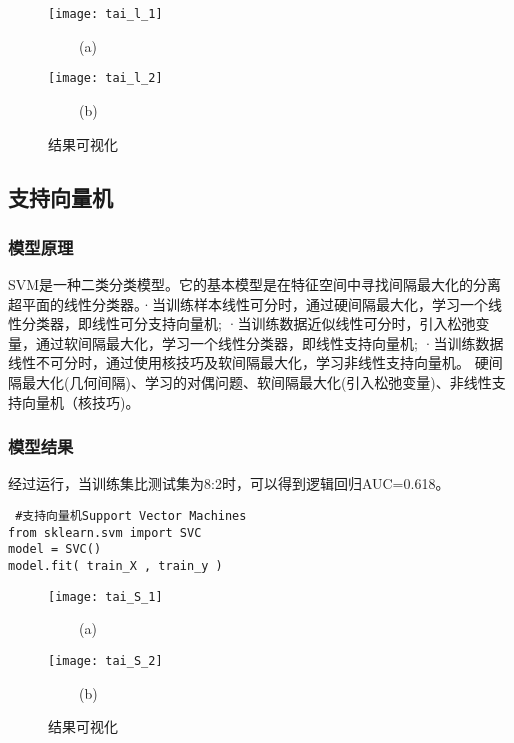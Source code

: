 \documentclass[withoutpreface,bwprint]{cumcmthesis} %
\begin{document}
\begin{figure}[H]
	\centering
	\begin{minipage}[t]{0.48\textwidth}
		\centering
		\texttt{[image: tai\_l\_1]}
		\centerline{$\ \ \ \ \ \ \ \ \ \ $(a)}
	\end{minipage}
	\begin{minipage}[t]{0.48\textwidth}
		\centering
		\texttt{[image: tai\_l\_2]}
		\centerline{$\ \ \ \ \ \ \ \ \ \ $(b)}
	\end{minipage}
	
	\caption{结果可视化}
\end{figure}



\subsection{支持向量机}
\subsubsection{模型原理}
\par SVM是一种二类分类模型。它的基本模型是在特征空间中寻找间隔最大化的分离超平面的线性分类器。·当训练样本线性可分时，通过硬间隔最大化，学习一个线性分类器，即线性可分支持向量机;
·当训练数据近似线性可分时，引入松弛变量，通过软间隔最大化，学习一个线性分类器，即线性支持向量机;
·当训练数据线性不可分时，通过使用核技巧及软间隔最大化，学习非线性支持向量机。
硬间隔最大化(几何间隔)、学习的对偶问题、软间隔最大化(引入松弛变量)、非线性支持向量机（核技巧)。



\subsubsection{模型结果}
\par 经过运行，当训练集比测试集为8:2时，可以得到逻辑回归AUC=0.618。
\begin{lstlisting}
 #支持向量机Support Vector Machines
from sklearn.svm import SVC
model = SVC()
model.fit( train_X , train_y )
\end{lstlisting}

\begin{figure}[H]
	\centering
	\begin{minipage}[t]{0.48\textwidth}
		\centering
		\texttt{[image: tai\_S\_1]}
		\centerline{$\ \ \ \ \ \ \ \ \ \ $(a)}
	\end{minipage}
	\begin{minipage}[t]{0.48\textwidth}
		\centering
		\texttt{[image: tai\_S\_2]}
		\centerline{$\ \ \ \ \ \ \ \ \ \ $(b)}
	\end{minipage}
	
	\caption{结果可视化}
\end{figure}
\end{document}
